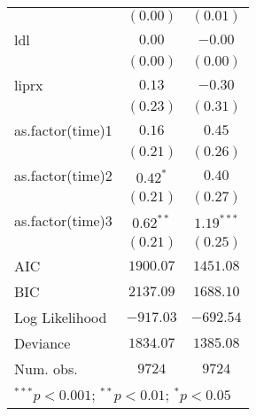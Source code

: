 \begin{tabular}{l c c}
                 & $(0.00)$       & $(0.01)$      \\
ldl              & $0.00$         & $-0.00$       \\
                 & $(0.00)$       & $(0.00)$      \\
liprx            & $0.13$         & $-0.30$       \\
                 & $(0.23)$       & $(0.31)$      \\
as.factor(time)1 & $0.16$         & $0.45$        \\
                 & $(0.21)$       & $(0.26)$      \\
as.factor(time)2 & $0.42^{*}$     & $0.40$        \\
                 & $(0.21)$       & $(0.27)$      \\
as.factor(time)3 & $0.62^{**}$    & $1.19^{***}$  \\
                 & $(0.21)$       & $(0.25)$      \\
\midrule
AIC              & $1900.07$      & $1451.08$     \\
BIC              & $2137.09$      & $1688.10$     \\
Log Likelihood   & $-917.03$      & $-692.54$     \\
Deviance         & $1834.07$      & $1385.08$     \\
Num. obs.        & $9724$         & $9724$        \\
\bottomrule
\multicolumn{3}{l}{\scriptsize{$^{***}p<0.001$; $^{**}p<0.01$; $^{*}p<0.05$}}
\end{tabular}
